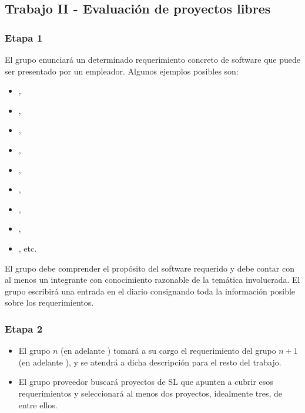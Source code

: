 \subsection {Trabajo II - Evaluación de proyectos libres}

\subsubsection{Etapa 1} 
El grupo enunciará un determinado requerimiento concreto de software que puede ser presentado por un empleador. Algunos ejemplos posibles son:
\begin{itemize}
	\item {},
	\item  {},
	\item  {},
	\item  {}, 
	\item {},
	\item  {}, 
	\item {},
	\item {},
	\item {}, etc.
\end{itemize}
El grupo debe comprender el propósito del software requerido y debe contar con al menos un integrante con conocimiento razonable de la temática involucrada. El grupo escribirá una entrada en el diario consignando toda la información posible sobre los requerimientos. 

\subsubsection{Etapa 2} 

\begin{itemize}
	\item El grupo $n$ (en adelante ) tomará a su cargo el requerimiento del grupo $n+1$ (en adelante ), y se atendrá a dicha descripción para el resto del trabajo. 
	\item El grupo proveedor buscará proyectos de SL que apunten a cubrir esos requerimientos y seleccionará al menos dos proyectos, idealmente tres, de entre ellos.
\end{itemize}


